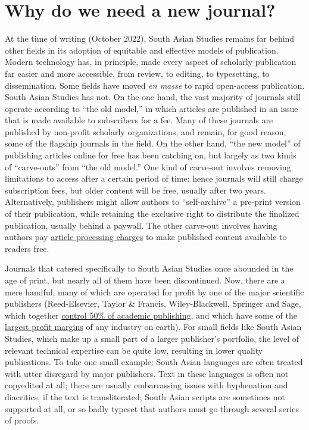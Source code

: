\section{Why do we need a new journal?}\label{mksein2dedb}
      At the time of writing (October 2022), South Asian Studies remains far behind other fields in its adoption of equitable and effective models of publication. Modern technology has, in principle, made every aspect of scholarly publication far easier and more accessible, from review, to editing, to typesetting, to dissemination. Some fields have moved \emph{en masse} to rapid open-access publication. South Asian Studies has not. On the one hand, the vast majority of journals still operate according to “the old model,” in which articles are published in an issue that is made available to subscribers for a fee. Many of these journals are published by non-profit scholarly organizations, and remain, for good reason, some of the flagship journals in the field. On the other hand, “the new model” of publishing articles online for free has been catching on, but largely as two kinds of “carve-outs” from “the old model.” One kind of carve-out involves removing limitations to access after a certain period of time: hence journals will still charge subscription fees, but older content will be free, usually after two years. Alternatively, publishers might allow authors to “self-archive” a pre-print version of their publication, while retaining the exclusive right to distribute the finalized publication, usually behind a paywall. The other carve-out involves having authors pay \hyperref[whjsbp15r2e9]{article processing charges} to make published content available to readers free.

Journals that catered specifically to South Asian Studies once abounded in the age of print, but nearly all of them have been discontinued. Now, there are a mere handful, many of which are operated for profit by one of the major scientific publishers (Reed-Elsevier, Taylor \& Francis, Wiley-Blackwell, Springer and Sage, which together \href{https://www.sciencealert.com/these-five-companies-control-more-than-half-of-academic-publishing}{control 50\% of academic publishing}, and which have some of the \href{https://www.theguardian.com/science/2017/jun/27/profitable-business-scientific-publishing-bad-for-science}{largest profit margins} of any industry on earth). For small fields like South Asian Studies, which make up a small part of a larger publisher’s portfolio, the level of relevant technical expertise can be quite low, resulting in lower quality publications. To take one small example: South Asian languages are often treated with utter disregard by major publishers. Text in these languages is often not copyedited at all; there are usually embarrassing issues with hyphenation and diacritics, if the text is transliterated; South Asian scripts are sometimes not supported at all, or so badly typeset that authors must go through several series of proofs. 

